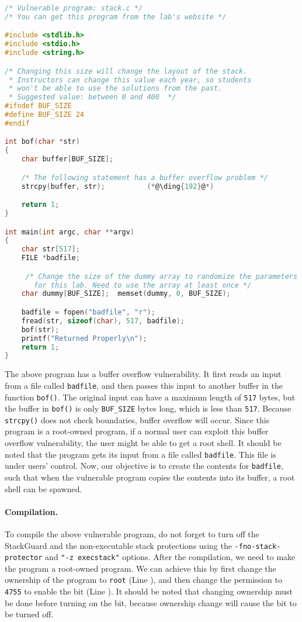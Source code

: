 \begin{lstlisting}[language=C]
/* Vulnerable program: stack.c */
/* You can get this program from the lab's website */

#include <stdlib.h>
#include <stdio.h>
#include <string.h>

/* Changing this size will change the layout of the stack.
 * Instructors can change this value each year, so students
 * won't be able to use the solutions from the past.
 * Suggested value: between 0 and 400  */
#ifndef BUF_SIZE
#define BUF_SIZE 24
#endif

int bof(char *str)
{
    char buffer[BUF_SIZE];

    /* The following statement has a buffer overflow problem */ 
    strcpy(buffer, str);          (*@\ding{192}@*)

    return 1;
}

int main(int argc, char **argv)
{
    char str[517];
    FILE *badfile;

     /* Change the size of the dummy array to randomize the parameters
       for this lab. Need to use the array at least once */
    char dummy[BUF_SIZE];  memset(dummy, 0, BUF_SIZE); 

    badfile = fopen("badfile", "r");
    fread(str, sizeof(char), 517, badfile);
    bof(str);
    printf("Returned Properly\n");
    return 1;
}
\end{lstlisting}

The above program has a buffer overflow vulnerability. It first 
reads an input from a file called \texttt{badfile}, and then passes this
input to another buffer in the function {\tt bof()}. The 
original input can have a maximum length of \texttt{517} bytes, but the buffer
in {\tt bof()} is only \texttt{BUF\_SIZE} bytes long, which is less than
\texttt{517}. 
Because {\tt strcpy()} does not check
boundaries, buffer overflow will occur.
Since this program is a root-owned \setuid program, if a normal user can exploit
this buffer overflow vulnerability, the user might be 
able to get a root shell.
It should be noted that 
the program gets its input from a file called \texttt{badfile}. This file
is under users' control. Now, our objective is to 
create the contents for \texttt{badfile}, such that when the vulnerable program
copies the contents into its buffer, a root shell can be spawned.


\paragraph{Compilation.}
To compile the above vulnerable program, do not forget to 
turn off the StackGuard and the non-executable stack protections 
using the \texttt{-fno-stack-protector} and \texttt{"-z execstack"} options.
After the compilation, we need to make the program a
root-owned \setuid program. We can achieve this by first change the ownership of the program to
\texttt{root} (Line ), and then change the permission to \texttt{4755} to enable the
\setuid bit (Line ). It should be noted that changing ownership must be done before
turning on the \setuid bit, because ownership change will cause the \setuid bit to be turned
off.



